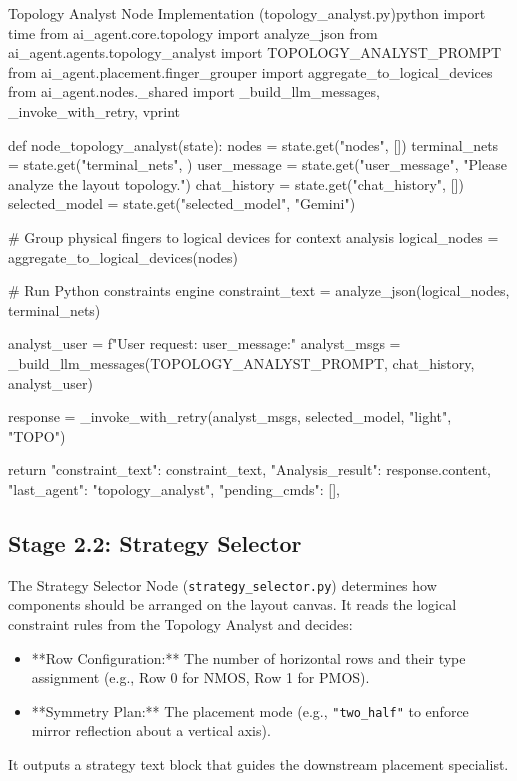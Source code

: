 \begin{thesiscode}{Topology Analyst Node Implementation (topology\_analyst.py)}{python}
import time
from ai_agent.core.topology import analyze_json
from ai_agent.agents.topology_analyst import TOPOLOGY_ANALYST_PROMPT
from ai_agent.placement.finger_grouper import aggregate_to_logical_devices
from ai_agent.nodes._shared import _build_llm_messages, _invoke_with_retry, vprint

def node_topology_analyst(state):
    nodes = state.get("nodes", [])
    terminal_nets = state.get("terminal_nets", {})
    user_message = state.get("user_message", "Please analyze the layout topology.")
    chat_history = state.get("chat_history", [])
    selected_model = state.get("selected_model", "Gemini")

    # Group physical fingers to logical devices for context analysis
    logical_nodes = aggregate_to_logical_devices(nodes)
    
    # Run Python constraints engine
    constraint_text = analyze_json(logical_nodes, terminal_nets)
    
    analyst_user = f"User request: {user_message}\n\nConstraints:\n\n"
    analyst_msgs = _build_llm_messages(TOPOLOGY_ANALYST_PROMPT, chat_history, analyst_user)
    
    response = _invoke_with_retry(analyst_msgs, selected_model, "light", "TOPO")
    
    return {
        "constraint_text": constraint_text,
        "Analysis_result": response.content,
        "last_agent": "topology_analyst",
        "pending_cmds": [],
    }
\end{thesiscode}

\subsection{Stage 2.2: Strategy Selector}
The Strategy Selector Node (\texttt{strategy\_selector.py}) determines how components should be arranged on the layout canvas. It reads the logical constraint rules from the Topology Analyst and decides:
\begin{itemize}
    \item **Row Configuration:** The number of horizontal rows and their type assignment (e.g., Row 0 for NMOS, Row 1 for PMOS).
    \item **Symmetry Plan:** The placement mode (e.g., \texttt{"two\_half"} to enforce mirror reflection about a vertical axis).
\end{itemize}
It outputs a strategy text block that guides the downstream placement specialist.

